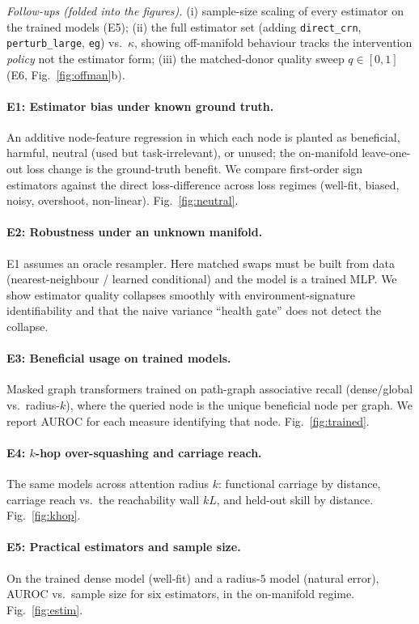 \emph{Follow-ups (folded into the figures).} (i) sample-size scaling of every estimator on the
trained models (E5); (ii) the full estimator set (adding \texttt{direct\_crn},
\texttt{perturb\_large}, \texttt{eg}) vs.\ $\kappa$, showing off-manifold behaviour tracks the
intervention \emph{policy} not the estimator form; (iii) the matched-donor quality sweep
$q\!\in\![0,1]$ (E6, Fig.~\ref{fig:offman}b).

\paragraph{E1: Estimator bias under known ground truth.}
An additive node-feature regression in which each node is planted as beneficial, harmful,
neutral (used but task-irrelevant), or unused; the on-manifold leave-one-out loss change is the
ground-truth benefit. We compare first-order sign estimators against the direct loss-difference
across loss regimes (well-fit, biased, noisy, overshoot, non-linear). Fig.~\ref{fig:neutral}.

\paragraph{E2: Robustness under an unknown manifold.}
E1 assumes an oracle resampler. Here matched swaps must be built from data (nearest-neighbour /
learned conditional) and the model is a trained MLP. We show estimator quality collapses smoothly
with environment-signature identifiability and that the naive variance ``health gate'' does not
detect the collapse.

\paragraph{E3: Beneficial usage on trained models.}
Masked graph transformers trained on path-graph associative recall (dense/global vs.\ radius-$k$),
where the queried node is the unique beneficial node per graph. We report AUROC for each measure
identifying that node. Fig.~\ref{fig:trained}.

\paragraph{E4: $k$-hop over-squashing and carriage reach.}
The same models across attention radius $k$: functional carriage by distance, carriage reach vs.\
the reachability wall $kL$, and held-out skill by distance. Fig.~\ref{fig:khop}.

\paragraph{E5: Practical estimators and sample size.}
On the trained dense model (well-fit) and a radius-$5$ model (natural error), AUROC vs.\ sample
size for six estimators, in the on-manifold regime. Fig.~\ref{fig:estim}.

